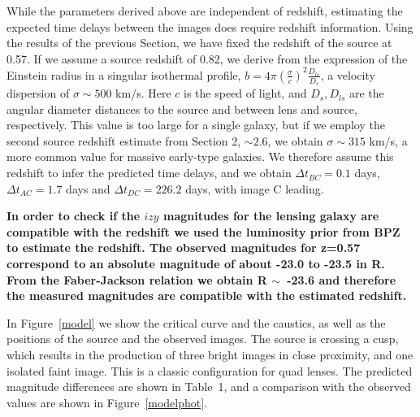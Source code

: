 \documentclass[manuscript]{aastex}
\begin{document}
While the parameters derived above are independent of redshift, estimating the expected time delays between the images does require redshift information. Using the results of the previous Section, we have fixed the redshift of the source at 0.57. If we assume a source redshift of 0.82, we derive from the expression of the Einstein radius in a singular isothermal profile, $b=4\pi\left(\frac{\sigma}{c}\right)^2\frac{D_{ls}}{D_{s}}$, a velocity dispersion of $\sigma\sim500$ km/s. Here $c$ is the speed of light, and $D_{s},D_{ls}$ are the angular diameter distances to the source and between lens and source, respectively. This value is too large for a single galaxy, but if we employ the second source redshift estimate from Section 2, $\sim2.6$, we obtain $\sigma\sim315$ km/s, a more common value for massive early-type galaxies. We therefore assume this redshift to infer the predicted time delays, and we obtain $\Delta t_{BC} = 0.1$ days, $\Delta t_{AC} = 1.7$ days and $\Delta t_{DC} = 226.2$ days, with image C leading.   

{\bf In order to check if the $izy$ magnitudes for the lensing galaxy are compatible with the redshift we used the luminosity prior from BPZ \citep{ben00} to estimate the redshift. The observed magnitudes for z=0.57 correspond to an absolute magnitude of about -23.0 to -23.5 in R. From the Faber-Jackson relation \citep{fab76} we obtain R $\sim$~-23.6 and therefore the measured magnitudes are compatible with the estimated redshift.}

In Figure~\ref{model} we show the critical curve and the caustics, as well as the positions of the source and the observed images. The source is crossing a cusp, which results in the production of three bright images in close proximity, and one isolated faint image. This is a classic configuration for quad lenses. The predicted magnitude differences are shown in Table~1, and a comparison with the observed values are shown in Figure~\ref{modelphot}. 
\end{document}
